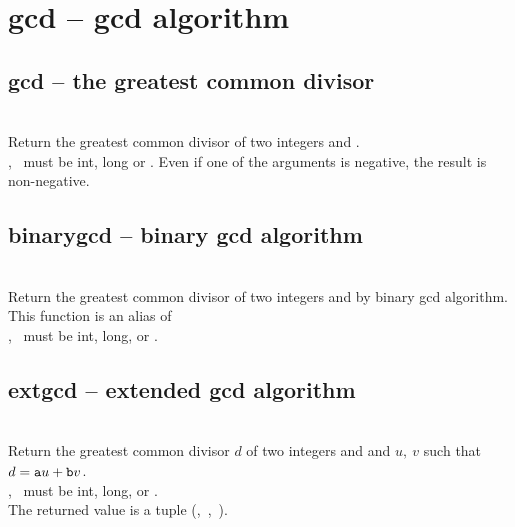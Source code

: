 

 \section{gcd -- gcd algorithm}
%
  \subsection{gcd -- the greatest common divisor}
   \\
   \spacing
   \quad Return the greatest common divisor of two integers  and .\\
   \spacing
   \quad {},\  must be int, long or .
   Even if one of the arguments is negative, the result is non-negative.\\
%
  \subsection{binarygcd -- binary gcd algorithm}
   \\
   \spacing
   \quad Return the greatest common divisor of two integers  and  by binary gcd algorithm.\\
   \spacing
   \quad \negok This function is an alias of \\
   \spacing
   \quad {},\  must be int, long, or .\\
%
  \subsection{extgcd -- extended gcd algorithm}
   \\
   \spacing
   \quad Return the greatest common divisor $d$ of two integers  and  and $u,\ v$ such that $d = {\texttt a}u + {\texttt b}v$.\\
   \spacing
   \quad {},\  must be int, long, or .\\
   The returned value is a tuple (,\ ,\ ).\\
%
